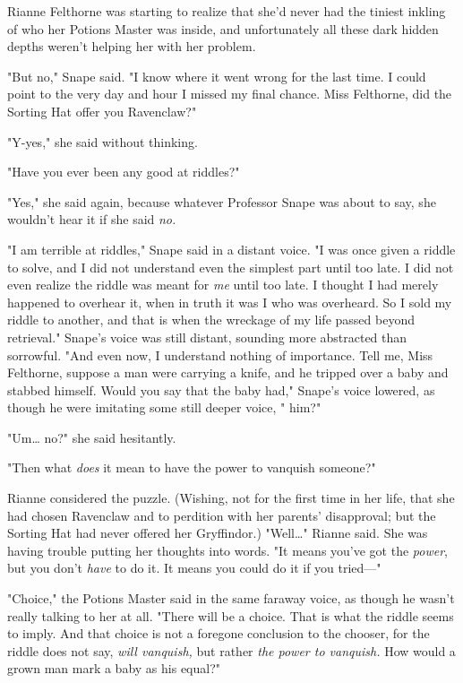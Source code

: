 Rianne Felthorne was starting to realize that she'd never had the tiniest
inkling of who her Potions Master was inside, and unfortunately all these dark
hidden depths weren't helping her with her problem.

"But no," Snape said. "I know where it went wrong for the last time. I could
point to the very day and hour I missed my final chance. Miss Felthorne, did
the Sorting Hat offer you Ravenclaw?"

"Y-yes," she said without thinking.

"Have you ever been any good at riddles?"

"Yes," she said again, because whatever Professor Snape was about to say, she
wouldn't hear it if she said \emph{no.}

"I am terrible at riddles," Snape said in a distant voice. "I was once given a
riddle to solve, and I did not understand even the simplest part until too
late. I did not even realize the riddle was meant for \emph{me} until too late.
I thought I had merely happened to overhear it, when in truth it was I who was
overheard. So I sold my riddle to another, and that is when the wreckage of my
life passed beyond retrieval." Snape's voice was still distant, sounding more
abstracted than sorrowful. "And even now, I understand nothing of importance.
Tell me, Miss Felthorne, suppose a man were carrying a knife, and he tripped
over a baby and stabbed himself. Would you say that the baby had," Snape's
voice lowered, as though he were imitating some still deeper voice, " him?"

"Um{\ldots} no?" she said hesitantly.

"Then what \emph{does} it mean to have the power to vanquish someone?"

Rianne considered the puzzle. (Wishing, not for the first time in her life,
that she had chosen Ravenclaw and to perdition with her parents' disapproval;
but the Sorting Hat had never offered her Gryffindor.) "Well{\ldots}" Rianne
said. She was having trouble putting her thoughts into words. "It means you've
got the \emph{power}, but you don't \emph{have} to do it. It means you could do
it if you tried---"

"Choice," the Potions Master said in the same faraway voice, as though he
wasn't really talking to her at all. "There will be a choice. That is what the
riddle seems to imply. And that choice is not a foregone conclusion to the
chooser, for the riddle does not say, \emph{will vanquish,} but rather
\emph{the power to vanquish.} How would a grown man mark a baby as his equal?"

